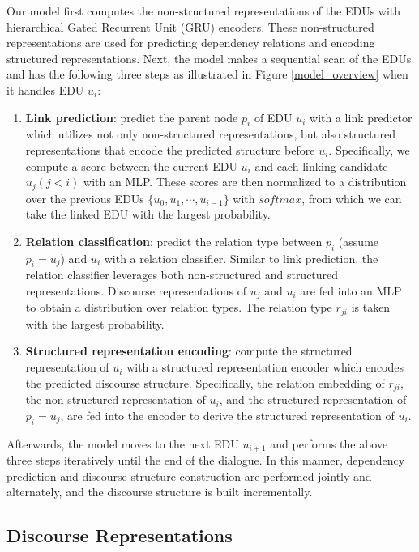\documentclass[letterpaper]{article} \usepackage{aaai19}  \usepackage{times}  \usepackage{helvet}  \usepackage{courier}  \usepackage{url}  \usepackage{graphicx}  \usepackage{amssymb}
\begin{document}
Our model first computes the non-structured representations of the EDUs with hierarchical Gated Recurrent Unit (GRU) \cite{cholearning} encoders.
These non-structured representations are used for predicting dependency relations and encoding structured representations.
Next, the model makes a sequential scan of the EDUs and has the following three steps as illustrated in Figure \ref{model_overview} when it handles EDU $u_i$:
\begin{enumerate}
    \item \textbf{Link prediction}: predict the parent node $p_i$ of EDU $u_i$ with a link predictor which utilizes not only non-structured representations, but also structured representations that encode the predicted structure before $u_i$. 
    Specifically, we compute a score between the current EDU $u_i$ and each linking candidate $u_j(j<i)$ with an MLP. These scores are then normalized to a distribution over the previous EDUs $\{u_0,u_1,\cdots,u_{i-1}\}$ with $softmax$, from which we can take the linked EDU with the largest probability.
    
    \item \textbf{Relation classification}: predict the relation type between $p_i$ (assume $p_i=u_j$) and $u_i$ with a relation classifier. Similar to link prediction, the relation classifier leverages both non-structured and structured representations. Discourse representations of $u_j$ and $u_i$ are fed into an MLP to obtain a distribution over relation types.
    The relation type $r_{ji}$ is taken with the largest probability.
    
    \item \textbf{Structured representation encoding}: compute the structured representation of $u_i$ with a structured representation encoder which encodes the predicted discourse structure. Specifically, the relation embedding of $r_{ji}$, the non-structured representation of $u_i$, and the structured representation of $p_i=u_j$, are fed into the encoder to derive the structured representation of $u_i$.    
    
\end{enumerate}

Afterwards, the model moves to the next EDU $u_{i+1}$ and performs the above three steps iteratively until the end of the dialogue. In this manner, dependency prediction and discourse structure construction are performed jointly and alternately, and the discourse structure is built incrementally.

\subsection{Discourse Representations}
\end{document}
